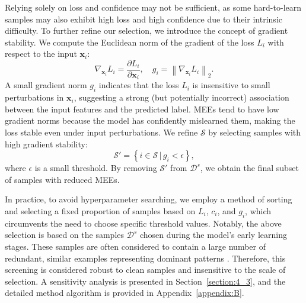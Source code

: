 Relying solely on loss and confidence may not be sufficient, as some hard-to-learn samples may also exhibit high loss and high confidence due to their intrinsic difficulty. To further refine our selection, we introduce the concept of gradient stability. We compute the Euclidean norm of the gradient of the loss \( L_i \) with respect to the input \( \mathbf{x}_i \):
\begin{equation}
\nabla_{\mathbf{x}_i} L_i = \frac{\partial L_i}{\partial \mathbf{x}_i}, \quad g_i = \left\| \nabla_{\mathbf{x}_i} L_i \right\|_2.
\end{equation}
A small gradient norm \( g_i \) indicates that the loss \( L_i \) is insensitive to small perturbations in \( \mathbf{x}_i \), suggesting a strong (but potentially incorrect) association between the input features and the predicted label. MEEs tend to have low gradient norms because the model has confidently mislearned them, making the loss stable even under input perturbations.
We refine \( \mathcal{S} \) by selecting samples with high gradient stability:
\begin{equation}
\mathcal{S}' = \left\{ i \in \mathcal{S} \,\Big|\, g_i < \epsilon \right\},
\end{equation}
where \( \epsilon \) is a small threshold. By removing \( \mathcal{S}' \) from \( \mathcal{D}^s \), we obtain the final subset of samples with reduced MEEs.

In practice, to avoid hyperparameter searching, we employ a method of sorting and selecting a fixed proportion of samples based on \( L_i \), \( c_i \), and \( g_i \), which circumvents the need to choose specific threshold values. Notably, the above selection is based on the samples \( \mathcal{D}^s \) chosen during the model's early learning stages. These samples are often considered to contain a large number of redundant, similar examples representing dominant patterns \cite{toneva2018empirical, feldman2020does, feldman2020neural,yuan2024early}. Therefore, this screening is considered robust to clean samples and insensitive to the scale of selection.
A sensitivity analysis is presented in Section~\ref{section:4_3}, and the detailed method algorithm is provided in Appendix~\ref{appendix:B}.

\label{sec3}
